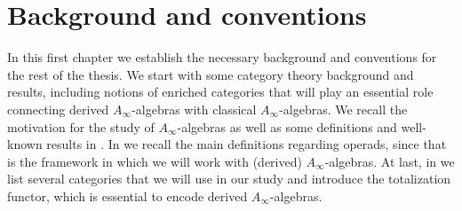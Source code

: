 \documentclass[Thesis.tex]{subfiles}
\begin{document}
\doublespacing
\sloppy
\chapter{Background and conventions}\label{Sec1}

In this first chapter we establish the necessary background and conventions for the rest of the thesis. We start  with some category theory background and results, including notions of enriched categories that will play an essential role connecting derived $A_\infty$-algebras with classical $A_\infty$-algebras. We recall the motivation  for the study of $A_\infty$-algebras as well as some definitions and well-known results in . In  we recall the main definitions regarding operads, since that is the framework in which we will work with (derived) $A_\infty$-algebras. At last, in  we list several categories that we will use in our study and introduce the totalization functor, which is essential to encode derived $A_\infty$-algebras.



\end{document}
